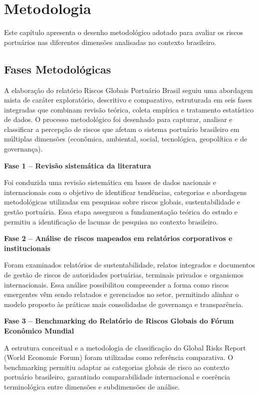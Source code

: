 \documentclass[
  portuguese,
  letterpaper,
  DIV=11,
  numbers=noendperiod]{scrreprt}
\begin{document}
\chapter{Metodologia}\label{metodologia}

Este capítulo apresenta o desenho metodológico adotado para avaliar os
riscos portuários nas diferentes dimensões analisadas no contexto
brasileiro.

\section{Fases Metodológicas}\label{fases-metodoluxf3gicas}

A elaboração do relatório Riscos Globais Portuário Brasil seguiu uma
abordagem mista de caráter exploratório, descritivo e comparativo,
estruturada em seis fases integradas que combinam revisão teórica,
coleta empírica e tratamento estatístico de dados. O processo
metodológico foi desenhado para capturar, analisar e classificar a
percepção de riscos que afetam o sistema portuário brasileiro em
múltiplas dimensões (econômica, ambiental, social, tecnológica,
geopolítica e de governança).

\textbf{Fase 1 -- Revisão sistemática da literatura}

Foi conduzida uma revisão sistemática em bases de dados nacionais e
internacionais com o objetivo de identificar tendências, categorias e
abordagens metodológicas utilizadas em pesquisas sobre riscos globais,
sustentabilidade e gestão portuária. Essa etapa assegurou a
fundamentação teórica do estudo e permitiu a identificação de lacunas de
pesquisa no contexto brasileiro.

\textbf{Fase 2 -- Análise de riscos mapeados em relatórios corporativos
e institucionais}

Foram examinados relatórios de sustentabilidade, relatos integrados e
documentos de gestão de riscos de autoridades portuárias, terminais
privados e organismos internacionais. Essa análise possibilitou
compreender a forma como riscos emergentes vêm sendo relatados e
gerenciados no setor, permitindo alinhar o modelo proposto às práticas
mais consolidadas de governança e transparência.

\textbf{Fase 3 -- Benchmarking do Relatório de Riscos Globais do Fórum
Econômico Mundial}

A estrutura conceitual e a metodologia de classificação do Global Risks
Report (World Economic Forum) foram utilizadas como referência
comparativa. O benchmarking permitiu adaptar as categorias globais de
risco ao contexto portuário brasileiro, garantindo comparabilidade
internacional e coerência terminológica entre dimensões e subdimensões
de análise.
\end{document}
